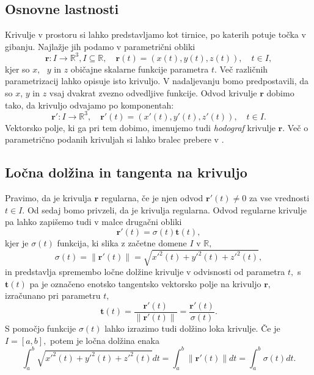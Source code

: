 \documentclass[12pt,a4paper,twoside]{article}
\theoremstyle{definition} %
\theoremstyle{plain} %
\theoremstyle{primerstyle}
\numberwithin{equation}{section}  %
\newcommand{\R}{\mathbb R}
\newcommand{\tV}{\mathbf{t}}
\newcommand{\rV}{\mathbf{r}}
\begin{document}
\subsection{Osnovne lastnosti}

Krivulje v prostoru si lahko predstavljamo kot tirnice, po katerih potuje točka v gibanju. Najlažje jih podamo
v parametrični obliki
\begin{equation*}
\rV:I \to \R^3, I \subseteq \R, \quad \rV(t)=(x(t),y(t),z(t)), \quad t \in I,
\end{equation*}
kjer so 
$x,\text{ } y \text{ in } z$ običajne skalarne funkcije parametra $t.$ Več različnih parametrizacij lahko opisuje
isto krivuljo. V nadaljevanju bomo predpostavili, da so $x$, $y$ in $z$ vsaj dvakrat zvezno odvedljive funkcije.
Odvod krivulje $\rV$ dobimo tako, da krivuljo odvajamo po komponentah:
$$\rV':I \to \R^3, \quad \rV'(t)=(x'(t),y'(t),z'(t)), \quad t \in I.$$
Vektorsko polje, ki ga pri tem dobimo, imenujemo tudi \textit{hodograf} krivulje $\rV.$ Več o parametrično podanih krivuljah si lahko bralec prebere v \cite{struik1961lectures}.

\subsection{Ločna dolžina in tangenta na krivuljo}

Pravimo, da je krivulja $\rV$ regularna, če je njen odvod $\rV'(t) \neq 0$ za vse vrednosti $t \in I.$ Od sedaj bomo privzeli, da je krivulja regularna. Odvod regularne krivulje pa lahko zapišemo tudi v malce drugačni obliki
\begin{equation}
	\label{eq2_1}
	\rV'(t)=\sigma(t)\tV(t),
\end{equation}
kjer je $\sigma(t)$ funkcija, ki slika z začetne domene $I$ v $\R,$
\begin{equation}
	\sigma(t)=\lVert \rV'(t)\rVert=\sqrt{x'^2(t)+y'^2(t)+z'^2(t)},
\end{equation}
in predstavlja spremembo ločne dolžine krivulje v odvisnosti od parametra $t,$ s $\tV(t)$ pa je označeno enotsko tangentsko vektorsko polje na krivuljo $\rV,$ izračunano pri parametru $t,$
\begin{equation}
	\tV(t)=\frac{\rV'(t)}{\lVert \rV'(t) \rVert}=
	\frac{\rV'(t)}{\sigma(t)}.
\end{equation}
S pomočjo funkcije $\sigma(t)$ lahko izrazimo tudi dolžino loka krivulje. Če je $I=[a,b],$ potem je ločna dolžina enaka
\begin{equation}
	\int_a^b\sqrt{x'^2(t)+y'^2(t)+z'^2(t)}dt=\int_a^b\lVert \rV'(t) \rVert dt =\int_a^b\sigma(t)dt.
\end{equation}
\end{document}
